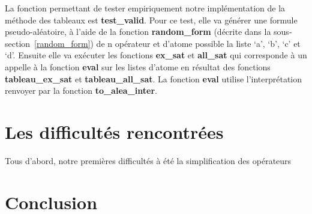 \documentclass[12pt]{article}
\begin{document}
    La fonction permettant de tester empiriquement notre implémentation de la 
    méthode des tableaux est \textbf{test\_valid}. Pour ce test, elle va 
    générer une formule pseudo-aléatoire, à l'aide de la fonction \textbf{random\_form}
    (décrite dans la sous-section~\ref{random_form}) de n opérateur et d'atome 
    possible la liste `a', `b', `c' et `d'. Ensuite elle va exécuter les fonctions 
    \textbf{ex\_sat} et \textbf{all\_sat} qui corresponde à un appelle à la fonction 
    \textbf{eval} sur les listes d'atome en résultat des fonctions 
    \textbf{tableau\_ex\_sat} et \textbf{tableau\_all\_sat}. La fonction 
    \textbf{eval} utilise l'interprétation renvoyer par la fonction 
    \textbf{to\_alea\_inter}.

    \section{Les difficultés rencontrées}

    Tous d'abord, notre premières difficultés à été la simplification des 
    opérateurs 
    
    \section{Conclusion}
\end{document}
